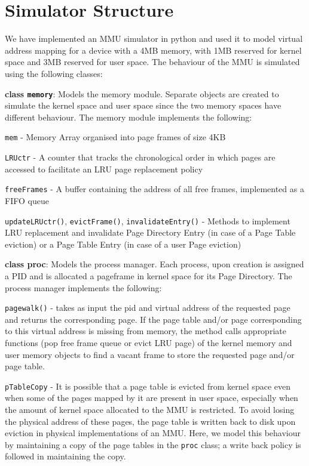 \documentclass[12pt,a4paper,english]{paper}
\begin{document}
\section{Simulator Structure}
We have implemented an MMU simulator in python and used it to model virtual address mapping for a device with a 4MB memory, with 1MB reserved for kernel space and 3MB reserved for user space. The behaviour of the MMU is simulated using the following classes:
\begin{compactitem}
    \item \textbf{class \texttt{memory}}: Models the memory module. Separate objects are created to simulate the kernel space and user space since the two memory spaces have different behaviour. The memory module implements the following:
    \begin{compactitem}
        \item \texttt{mem} - Memory Array organised into page frames of size 4KB
        \item \texttt{LRUctr} - A counter that tracks the chronological order in which pages are accessed to facilitate an LRU page replacement policy
        \item \texttt{freeFrames} - A buffer containing the address of all free frames, implemented as a FIFO queue
        \item \texttt{updateLRUctr()}, \texttt{evictFrame()}, \texttt{invalidateEntry()} - Methods to implement LRU replacement and invalidate Page Directory Entry (in case of a Page Table eviction) or a Page Table Entry (in case of a user Page eviction)
    \end{compactitem}
    \item \textbf{class proc}: Models the process manager. Each process, upon creation is assigned a PID and is allocated a pageframe in kernel space for its Page Directory. The process manager implements the following:
    \begin{compactitem}
        \item \texttt{pagewalk()} - takes as input the pid and virtual address of the requested page and returns the corresponding page. If the page table and/or page corresponding to this virtual address is missing from memory, the method calls appropriate functions (pop free frame queue or evict LRU page) of the kernel memory and user memory objects to find a vacant frame to store the requested page and/or page table.
        \item \texttt{pTableCopy} - It is possible that a page table is evicted from kernel space even when some of the pages mapped by it are present in user space, especially when the amount of kernel space allocated to the MMU is restricted. To avoid losing the physical address of these pages, the page table is written back to disk upon eviction in physical implementations of an MMU. Here, we model this behaviour by maintaining a copy of the page tables in the \texttt{proc} class; a write back policy is followed in maintaining the copy.

\end{compactitem}
\end{compactitem}
\end{document}
